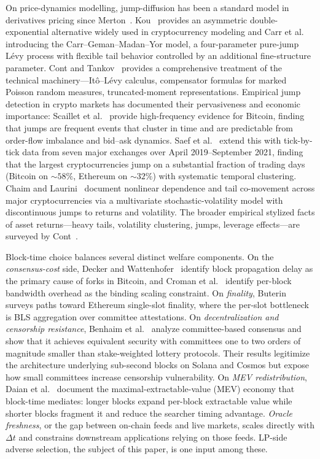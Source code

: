 \documentclass[runningheads]{llncs}
\newcommand{\dt}{\Delta t}
\newcommand{\1}{\mathbf{1}}
\begin{document}
On price-dynamics modelling, jump-diffusion has been a standard model in derivatives pricing since Merton~\cite{merton1976option}. Kou~\cite{kou2002jump} provides an asymmetric double-exponential alternative widely used in cryptocurrency modeling and Carr et al.~\cite{carr2002fine} introducing the Carr--Geman--Madan--Yor model, a four-parameter pure-jump L\'evy process with flexible tail behavior controlled by an additional fine-structure parameter. Cont and Tankov~\cite{cont2003financial} provides a comprehensive treatment of the technical machinery---It\^o--L\'evy calculus, compensator formulas for marked Poisson random measures, truncated-moment representations. Empirical jump detection in crypto markets has documented their pervasiveness and economic importance: Scaillet et al.~\cite{scaillet2020high} provide high-frequency evidence for Bitcoin, finding that jumps are frequent events that cluster in time and are predictable from order-flow imbalance and bid--ask dynamics. Saef et al.~\cite{saef2024temporal} extend this with tick-by-tick data from seven major exchanges over April 2019--September 2021, finding that the largest cryptocurrencies jump on a substantial fraction of trading days (Bitcoin on $\sim$$58\%$, Ethereum on $\sim$$32\%$) with systematic temporal clustering. Chaim and Laurini~\cite{chaim2019nonlinear} document nonlinear dependence and tail co-movement across major cryptocurrencies via a multivariate stochastic-volatility model with discontinuous jumps to returns and volatility. The broader empirical stylized facts of asset returns---heavy tails, volatility clustering, jumps, leverage effects---are surveyed by Cont~\cite{cont2001empirical}.

Block-time choice balances several distinct welfare components. On the \emph{consensus-cost} side, Decker and Wattenhofer~\cite{decker2013information} identify block propagation delay as the primary cause of forks in Bitcoin, and Croman et al.~\cite{croman2016scaling} identify per-block bandwidth overhead as the binding scaling constraint. On \emph{finality}, Buterin~\cite{buterin2023paths} surveys paths toward Ethereum single-slot finality, where the per-slot bottleneck is BLS aggregation over committee attestations. On \emph{decentralization and censorship resistance}, Benhaim et al.~\cite{benhaim2024scaling} analyze committee-based consensus and show that it achieves equivalent security with committees one to two orders of magnitude smaller than stake-weighted lottery protocols. Their results legitimize the architecture underlying sub-second blocks on Solana and Cosmos but expose how small committees increase censorship vulnerability. On \emph{MEV redistribution}, Daian et al.~\cite{daian2020flash} document the maximal-extractable-value (MEV) economy that block-time mediates: longer blocks expand per-block extractable value while shorter blocks fragment it and reduce the searcher timing advantage. \emph{Oracle freshness}, or the gap between on-chain feeds and live markets, scales directly with $\dt$ and constrains downstream applications relying on those feeds. LP-side adverse selection, the subject of this paper, is one input among these.
\end{document}
